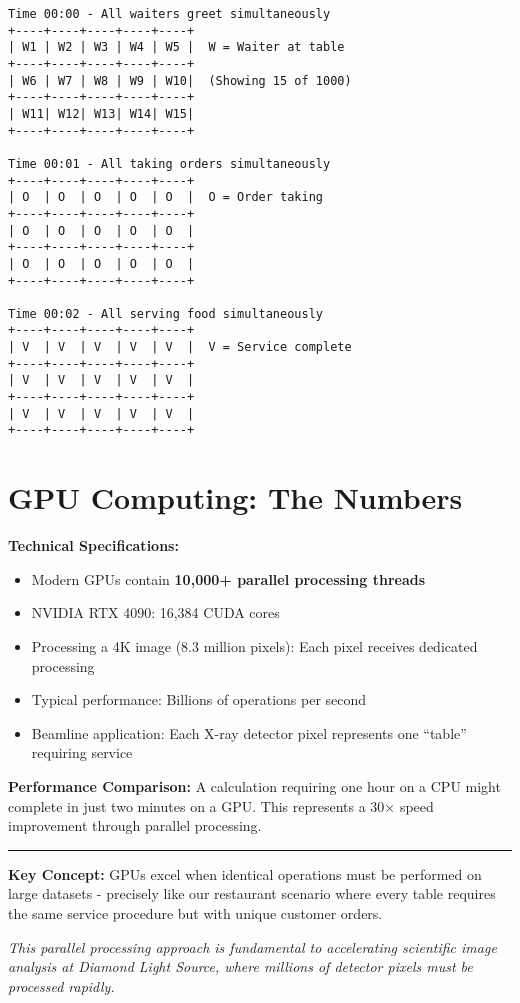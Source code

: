 \documentclass[11pt, a4paper]{article}
\begin{document}
\begin{verbatim}
Time 00:00 - All waiters greet simultaneously
+----+----+----+----+----+
| W1 | W2 | W3 | W4 | W5 |  W = Waiter at table
+----+----+----+----+----+
| W6 | W7 | W8 | W9 | W10|  (Showing 15 of 1000)
+----+----+----+----+----+
| W11| W12| W13| W14| W15|
+----+----+----+----+----+

Time 00:01 - All taking orders simultaneously
+----+----+----+----+----+
| O  | O  | O  | O  | O  |  O = Order taking
+----+----+----+----+----+
| O  | O  | O  | O  | O  |
+----+----+----+----+----+
| O  | O  | O  | O  | O  |
+----+----+----+----+----+

Time 00:02 - All serving food simultaneously
+----+----+----+----+----+
| V  | V  | V  | V  | V  |  V = Service complete
+----+----+----+----+----+
| V  | V  | V  | V  | V  |
+----+----+----+----+----+
| V  | V  | V  | V  | V  |
+----+----+----+----+----+
\end{verbatim}

\section*{GPU Computing: The Numbers}

\textbf{Technical Specifications:}
\begin{itemize}
    \item Modern GPUs contain \textbf{10,000+ parallel processing threads}
    \item NVIDIA RTX 4090: 16,384 CUDA cores
    \item Processing a 4K image (8.3 million pixels): Each pixel receives dedicated processing
    \item Typical performance: Billions of operations per second
    \item Beamline application: Each X-ray detector pixel represents one \enquote{table} requiring service
\end{itemize}

\textbf{Performance Comparison:} A calculation requiring one hour on a CPU might complete in just two minutes on a GPU. This represents a 30× speed improvement through parallel processing.

\par\noindent\rule{\linewidth}{0.4pt}\par

\textbf{Key Concept:} GPUs excel when identical operations must be performed on large datasets - precisely like our restaurant scenario where every table requires the same service procedure but with unique customer orders.

\textit{This parallel processing approach is fundamental to accelerating scientific image analysis at Diamond Light Source, where millions of detector pixels must be processed rapidly.}
\end{document}
